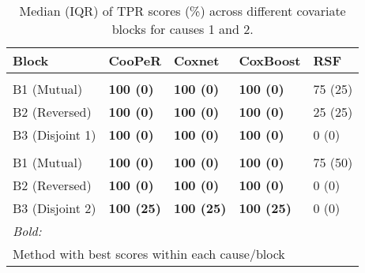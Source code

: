 \begin{table}
\centering
\caption{Median (IQR) of TPR scores (\%) across different covariate blocks for causes 1 and 2.\label{tab:tpr-median}}
\centering
\begin{tabular}[t]{lllll}
\toprule
Block & CooPeR & Coxnet & CoxBoost & RSF\\
\midrule
\addlinespace[0.3em]
\multicolumn{5}{l}{\textbf{Cause 1}}\\
\hspace{1em}B1 (Mutual) & \textbf{100 (0)} & \textbf{100 (0)} & \textbf{100 (0)} & 75 (25)\\
\hspace{1em}B2 (Reversed) & \textbf{100 (0)} & \textbf{100 (0)} & \textbf{100 (0)} & 25 (25)\\
\hspace{1em}B3 (Disjoint 1) & \textbf{100 (0)} & \textbf{100 (0)} & \textbf{100 (0)} & 0 (0)\\
\addlinespace[0.3em]
\multicolumn{5}{l}{\textbf{Cause 2}}\\
\hspace{1em}B1 (Mutual) & \textbf{100 (0)} & \textbf{100 (0)} & \textbf{100 (0)} & 75 (50)\\
\hspace{1em}B2 (Reversed) & \textbf{100 (0)} & \textbf{100 (0)} & \textbf{100 (0)} & 0 (0)\\
\hspace{1em}B3 (Disjoint 2) & \textbf{100 (25)} & \textbf{100 (25)} & \textbf{100 (25)} & 0 (0)\\
\bottomrule
\multicolumn{5}{l}{\rule{0pt}{1em}\textit{Bold:}}\\
\multicolumn{5}{l}{\rule{0pt}{1em}Method with best scores within each cause/block}\\
\end{tabular}
\end{table}
